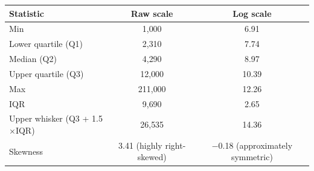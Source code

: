 \begin{tabular}{lcc}
\toprule
Statistic & Raw scale & Log scale \\
\midrule
Min & 1{,}000 & 6.91 \\
Lower quartile (Q1) & 2{,}310 & 7.74 \\
Median (Q2) & 4{,}290 & 8.97 \\
Upper quartile (Q3) & 12{,}000 & 10.39 \\
Max & 211{,}000 & 12.26 \\
IQR & 9{,}690 & 2.65 \\
Upper whisker (Q3 + 1.5$\times$IQR) & 26{,}535 & 14.36 \\
\midrule
Skewness & 3.41 (highly right-skewed) & $-$0.18 (approximately symmetric) \\
\bottomrule
\end{tabular}
